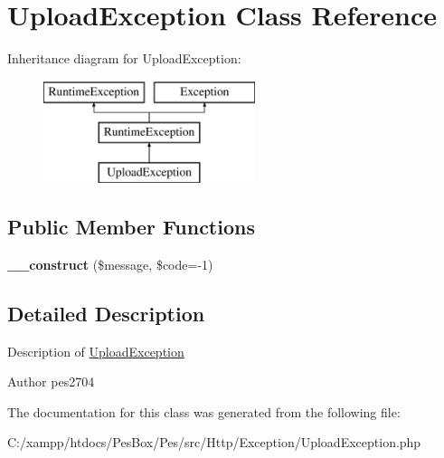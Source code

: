 \hypertarget{class_pes_1_1_http_1_1_exception_1_1_upload_exception}{}\section{Upload\+Exception Class Reference}
\label{class_pes_1_1_http_1_1_exception_1_1_upload_exception}
Inheritance diagram for Upload\+Exception\+:\begin{figure}[H]
\begin{center}
\leavevmode
\includegraphics[height=3.000000cm]{class_pes_1_1_http_1_1_exception_1_1_upload_exception}
\end{center}
\end{figure}
\subsection*{Public Member Functions}
\begin{DoxyCompactItemize}
\item 
\mbox{\label{class_pes_1_1_http_1_1_exception_1_1_upload_exception_a01541604d12bdd93fe7bcda5c7352a6a}} 
{\bfseries \+\_\+\+\_\+construct} (\$message, \$code=-\/1)
\end{DoxyCompactItemize}


\subsection{Detailed Description}
Description of \mbox{\hyperlink{class_pes_1_1_http_1_1_exception_1_1_upload_exception}{Upload\+Exception}}

\begin{DoxyAuthor}{Author}
pes2704 
\end{DoxyAuthor}


The documentation for this class was generated from the following file\+:\begin{DoxyCompactItemize}
\item 
C\+:/xampp/htdocs/\+Pes\+Box/\+Pes/src/\+Http/\+Exception/Upload\+Exception.\+php\end{DoxyCompactItemize}
